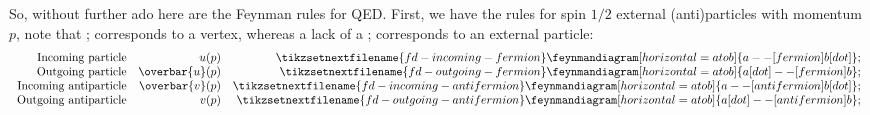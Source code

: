 \documentclass[fleqn]{NotesClass}
\newcommand{\diracadjoint}[1]{\overbar{#1}}
\begin{document}
    So, without further ado here are the Feynman rules for QED.
    First, we have the rules for spin \(1/2\) external (anti)particles with momentum \(p\), note that ; corresponds to a vertex, whereas a lack of a ; corresponds to an external particle:
    \begin{equation}
        \begin{array}{rrr}
            \text{Incoming particle} & u(p) & \tikzsetnextfilename{fd-incoming-fermion}\feynmandiagram[horizontal=a to b]{a -- [fermion] b [dot]}; \\
            \text{Outgoing particle} & \diracadjoint{u}(p) & \tikzsetnextfilename{fd-outgoing-fermion}\feynmandiagram[horizontal=a to b]{a [dot] -- [fermion] b}; \\
            \text{Incoming antiparticle} & \diracadjoint{v}(p) & \tikzsetnextfilename{fd-incoming-antifermion}\feynmandiagram[horizontal=a to b]{a -- [anti fermion] b [dot]}; \\
            \text{Outgoing antiparticle} & v(p) & \tikzsetnextfilename{fd-outgoing-antifermion}\feynmandiagram[horizontal=a to b]{a [dot] -- [anti fermion] b};
        \end{array}
    \end{equation}
\end{document}
